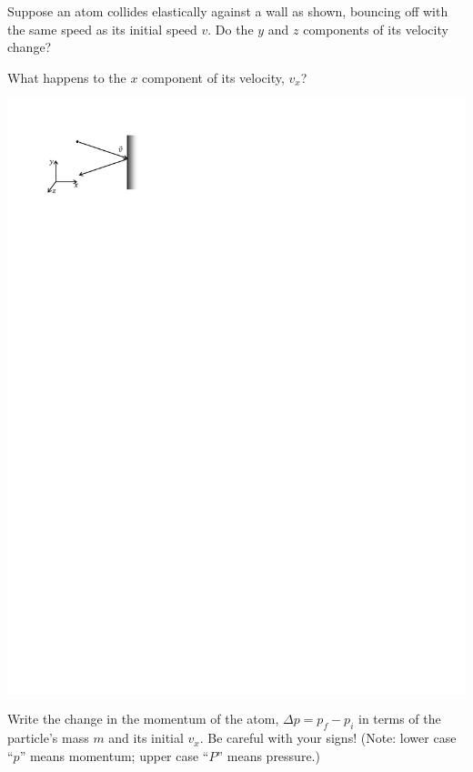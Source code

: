 \medskip
\begin{enumerate}[labparts]

\begin{minipage}{0.7\textwidth}

\item Suppose an atom collides elastically against a wall as shown, bouncing off with the same speed as its initial speed $v$.  Do the $y$ and $z$ components of its velocity change?
\answerspace{0.3in}

\item What happens to the $x$ component of its velocity, $v_x$?
\answerspace{0.3in}

\end{minipage}
\begin{minipage}{0.29\textwidth}
\includegraphics[width=\textwidth]{kin_theory_ideal/wall_collision.pdf}
\end{minipage}

\item Write the change in the momentum of the atom, $\Delta p = p_f - p_i$ in terms of the particle's mass $m$ and its initial $v_x$. Be careful with your signs! (Note: lower case ``$p$'' means momentum; upper case ``$P$'' means pressure.)  
\answerspace{0.3in}



\end{enumerate}
